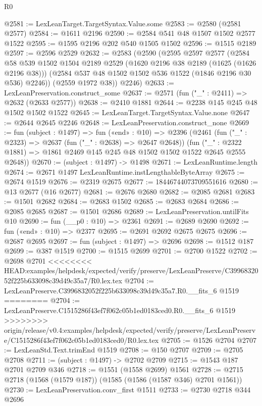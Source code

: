\begin{lexlean}{R0}
\begin{coremodule}
{{{{{{{{{{{{{{{{{{{{{{{{{{{{{{{{{{{{{{{{{{{{{{{{{{{{{{{{{{{{{{{{{{{{{{{{{@2581 := LexLeanTarget.TargetSyntax.Value.some
@2583 := @2580 (@2581 @2577)
@2584 := @1611 @2196
@2590 := @2584 @541 @48 @1507 @1502 @2577 @1522
@2595 := @1595 @2196 @202 @540 @1505 @1502
@2596 := @1515 @2189
@2597 := @2596 @2529
@2632 := @2583
    (@2590
      (@2595
        @2597
        @2577
        (@2584
          @58
          @539
          @1502
          @1504
          @2189
          @2529
          (@1620 @2196 @38 @2189 (@1625 (@1626 @2196 @38)))
          (@2584 @537 @48 @1502 @1502 @536 @1522 (@1846 @2196 @30 @536) @2246))
        (@2559 @1972 @38))
      @2246)
@2633 := LexLeanPreservation.construct_some
@2637 := @2571 (fun ("_" : @2411) => @2632 (@2633 @2577))
@2638 := @2410 @1881
@2644 := @2238 @145 @245 @48 @1502 @1502 @1522
@2645 := LexLeanTarget.TargetSyntax.Value.none
@2647 := @2644 @2645 @2246
@2648 := LexLeanPreservation.construct_none
@2669 := fun (subject : @1497) =>
  fun («end» : @10) =>
  @2396
    (@2461
      (fun ("_" : @2323) => @2637 (fun ("_" : @2638) => @2647 @2648))
      (fun ("_" : @2322 @1881) => @1861 @2469 @145 @245 @48 @1502 @1502 @1522 @2645 @2555 @2648))
@2670 := (subject : @1497) -> @1498
@2671 := LexLeanRuntime.length
@2674 := @2671 @1497 LexLeanRuntime.instLengthableByteArray
@2675 := @2674 @1519
@2676 := @2319 @2675
@2677 := 18446744073709551616
@2680 := @13 @2677 (@16 @2677)
@2681 := @2676 @2680
@2682 := @2085 @2681
@2683 := @1501 @2682
@2684 := @2683 @1502
@2685 := @2683 @2684
@2686 := @2085 @2685
@2687 := @1501 @2686
@2689 := LexLeanPreservation.untilFits @10
@2690 := fun (__p0 : @10) => @2361
@2691 := @2689 @2690
@2692 := fun («end» : @10) => @2377
@2695 := @2691 @2692 @2675 @2675
@2696 := @2687 @2695
@2697 := fun (subject : @1497) => @2696
@2698 := @1512 @187
@2699 := @387 @1519
@2700 := @1515 @2699
@2701 := @2700 @1522
@2702 := @2698 @2701
<<<<<<<< HEAD:examples/helpdesk/expected/verify/preserve/LexLeanPreserve/C3996832052f225b633098c39d49c35a7/R0.lex.tex
@2704 := LexLeanPreserve.C3996832052f225b633098c39d49c35a7.R0.__fits_6 @1519
========
@2704 := LexLeanPreserve.C1515286f43ef7f062c05b1ed0183ced0.R0.__fits_6 @1519
>>>>>>>> origin/release/v0.4:examples/helpdesk/expected/verify/preserve/LexLeanPreserve/C1515286f43ef7f062c05b1ed0183ced0/R0.lex.tex
@2705 := @1526 @2704
@2707 := LexLeanStd.Text.trimEnd @1519
@2708 := @150 @2707
@2709 := @2705 @2708
@2711 := (subject : @1497) -> @2702 @2709
@2715 := @1543 @187 @2701 @2709 @346
@2718 := @1551 (@1558 @2699) @1561
@2728 := @2715 @2718 (@1568 (@1579 @187)) (@1585 (@1586 (@1587 @346) @2701 @1561))
@2730 := LexLeanPreservation.conv_first @1511
@2733 := @2730 @2718 @344 @2696
}}}}}}}}}}}}}}}}}}}}}}}}}}}}}}}}}}}}}}}}}}}}}}}}}}}}}}}}}}}}}}}}}}}}}}}}}
\end{coremodule}
\end{lexlean}
